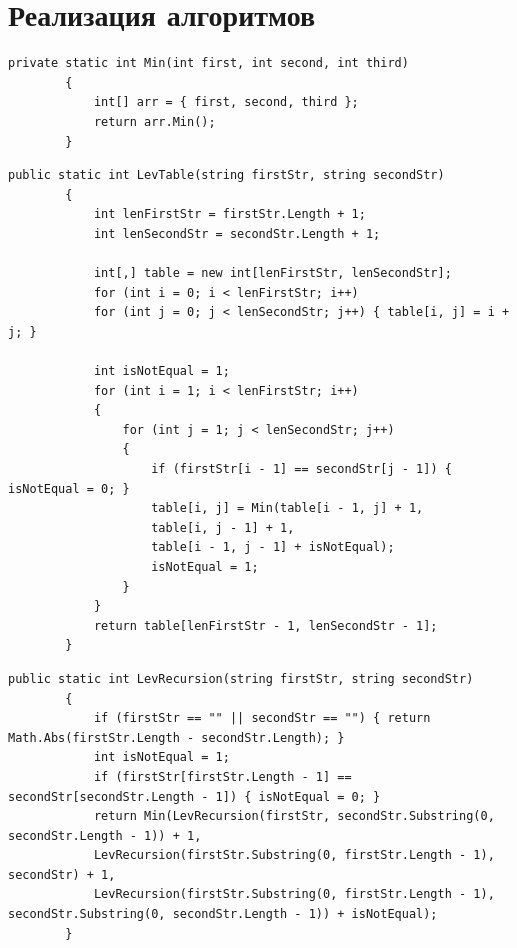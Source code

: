 \documentclass[12pt]{report}
\begin{document}
	\section{Реализация алгоритмов}
	\begin{lstlisting}[label=sone-code,caption=Функция нахождения минимума из 3 переменных]
		private static int Min(int first, int second, int third)
		{
			int[] arr = { first, second, third };
			return arr.Min();
		}
	\end{lstlisting}
	\begin{lstlisting}[label=some-code,caption=Функция нахождения расстояния Левенштейна используя матрицу]
		public static int LevTable(string firstStr, string secondStr)
		{
			int lenFirstStr = firstStr.Length + 1;
			int lenSecondStr = secondStr.Length + 1;
			
			int[,] table = new int[lenFirstStr, lenSecondStr];
			for (int i = 0; i < lenFirstStr; i++)
			for (int j = 0; j < lenSecondStr; j++) { table[i, j] = i + j; }
			
			int isNotEqual = 1;
			for (int i = 1; i < lenFirstStr; i++)
			{
				for (int j = 1; j < lenSecondStr; j++)
				{
					if (firstStr[i - 1] == secondStr[j - 1]) { isNotEqual = 0; }
					table[i, j] = Min(table[i - 1, j] + 1,
					table[i, j - 1] + 1,
					table[i - 1, j - 1] + isNotEqual);
					isNotEqual = 1;
				}
			}
			return table[lenFirstStr - 1, lenSecondStr - 1];
		}
	\end{lstlisting}
	\begin{lstlisting}[label=sone-code,caption=Функция нахождения расстояния Левенштейна рекурсивно]
		public static int LevRecursion(string firstStr, string secondStr)
		{
			if (firstStr == "" || secondStr == "") { return Math.Abs(firstStr.Length - secondStr.Length); }
			int isNotEqual = 1;
			if (firstStr[firstStr.Length - 1] == secondStr[secondStr.Length - 1]) { isNotEqual = 0; }
			return Min(LevRecursion(firstStr, secondStr.Substring(0, secondStr.Length - 1)) + 1,
			LevRecursion(firstStr.Substring(0, firstStr.Length - 1), secondStr) + 1,
			LevRecursion(firstStr.Substring(0, firstStr.Length - 1), secondStr.Substring(0, secondStr.Length - 1)) + isNotEqual);
		}
	\end{lstlisting}
\end{document}
